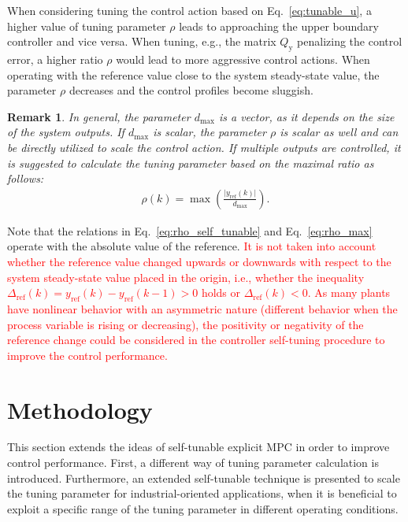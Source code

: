 \documentclass[preprint,12pt]{elsarticle}
\newcommand{\change}[1]{\textcolor{red}{#1}}
\newtheorem{remark}[theorem]{Remark}
\begin{document}
	When considering tuning the control action based on Eq.~\eqref{eq:tunable_u}, a higher value of tuning parameter $\rho$ leads to approaching the upper boundary controller and vice versa. When tuning, e.g., the matrix $Q_\mathrm{y}$ penalizing the control error, a higher ratio $\rho$ would lead to more aggressive control actions. When operating with the reference value close to the system steady-state value, the parameter $\rho$ decreases and the control profiles become sluggish.
	
	\begin{remark}
		In general, the parameter $d_{\max}$ is a vector, as it depends on the size of the system outputs. If $d_{\max}$ is scalar, the parameter $\rho$ is scalar as well and can be directly utilized to scale the control action. If multiple outputs are controlled, it is suggested to calculate the tuning parameter based on the maximal ratio as follows:
		\begin{eqnarray}
			\label{eq:rho_max}
			\rho(k) = \max \left( \frac{\vert y_{\mathrm{ref}}(k) \vert}{d_{\max}} \right).
		\end{eqnarray}
	\end{remark}
	
	Note that the relations in Eq.~\eqref{eq:rho_self_tunable} and Eq.~\eqref{eq:rho_max} operate with the absolute value of the reference. \change{It is not taken into account whether the reference value changed upwards or downwards with respect to the system steady-state value placed in the origin, i.e., whether the inequality $\Delta_\mathrm{ref}(k) = y_\mathrm{ref}(k)-y_\mathrm{ref}(k-1) > 0$ holds or $\Delta_\mathrm{ref}(k) < 0$. As many plants have nonlinear behavior with an asymmetric nature (different behavior when the process variable is rising or decreasing), the positivity or negativity of the reference change could be considered in the controller self-tuning procedure to improve the control performance.}
	
	
	\section{Methodology}
	\label{sec:methodology}
	This section extends the ideas of self-tunable explicit MPC in order to improve control performance. First, a different way of tuning parameter calculation is introduced. Furthermore, an extended self-tunable technique is presented to scale the tuning parameter for industrial-oriented applications, when it is beneficial to exploit a specific range of the tuning parameter in different operating conditions. 
	
\end{document}
